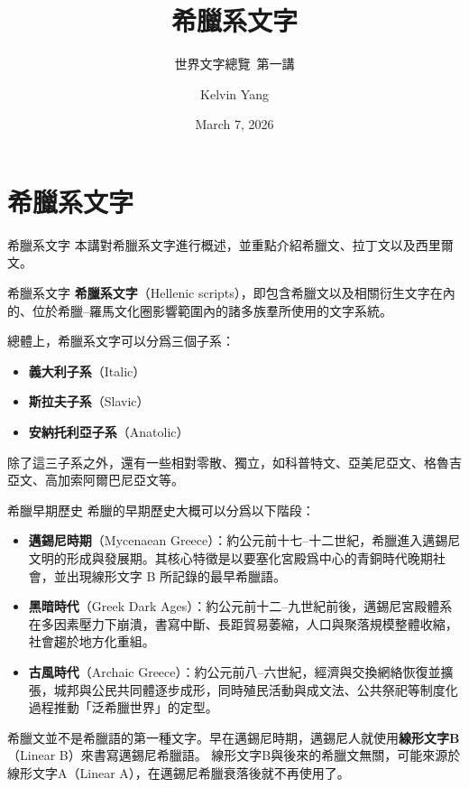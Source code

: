 \documentclass[aspectratio=169]{beamer}
\title{希臘系文字}
\subtitle{世界文字總覽~第一講}
\author{Kelvin Yang}
\date{March 7, 2026}
\begin{document}
\begin{frame}[plain]
    \titlepage
\end{frame}
\AgendaFrame

\section{希臘系文字}
\begin{frame}{希臘系文字}
    本講對希臘系文字進行概述，並重點介紹希臘文、拉丁文以及西里爾文。
    \begin{block}{希臘系文字}
        \textbf{希臘系文字}（Hellenic scripts），即包含希臘文以及相關衍生文字在內的、位於希臘--羅馬文化圈影響範圍內的諸多族羣所使用的文字系統。
    \end{block}

    總體上，希臘系文字可以分爲三個子系：
    \begin{itemize}
        \item \textbf{義大利子系}（Italic）
        \item \textbf{斯拉夫子系}（Slavic）
        \item \textbf{安納托利亞子系}（Anatolic）
    \end{itemize}
    除了這三子系之外，還有一些相對零散、獨立，如科普特文、亞美尼亞文、格魯吉亞文、高加索阿爾巴尼亞文等。
\end{frame}

\begin{frame}{希臘早期歷史}
    希臘的早期歷史大概可以分爲以下階段：
    \begin{itemize}
        \item \textbf{邁錫尼時期}（Mycenaean Greece）：約公元前十七--十二世紀，希臘進入邁錫尼文明的形成與發展期。其核心特徵是以要塞化宮殿爲中心的青銅時代晚期社會，並出現線形文字 B 所記錄的最早希臘語。
        \item \textbf{黑暗時代}（Greek Dark Ages）：約公元前十二--九世紀前後，邁錫尼宮殿體系在多因素壓力下崩潰，書寫中斷、長距貿易萎縮，人口與聚落規模整體收縮，社會趨於地方化重組。
        \item \textbf{古風時代}（Archaic Greece）：約公元前八--六世紀，經濟與交換網絡恢復並擴張，城邦與公民共同體逐步成形，同時殖民活動與成文法、公共祭祀等制度化過程推動「泛希臘世界」的定型。
    \end{itemize}

    希臘文並不是希臘語的第一種文字。早在邁錫尼時期，邁錫尼人就使用\textbf{線形文字B}（Linear B）來書寫邁錫尼希臘語。
    線形文字B與後來的希臘文無關，可能來源於線形文字A（Linear A），在邁錫尼希臘衰落後就不再使用了。
\end{frame}
\end{document}
